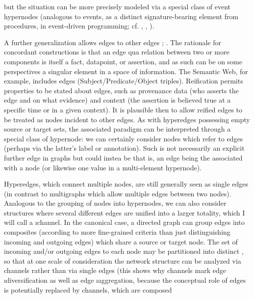 {\begin{description}
but the situation can be more precisely modeled via a 
special class of event hypernodes (analogous to 
events, as a distinct signature-bearing element from 
procedures, in event-driven programming; 
cf. \cite{JenniferPaykin}, 
\cite{PaykinKrishnaswami}, \cite{WolfgangJeltsch}). 
\item[Edges Incident to Edges]  A further generalization 
allows edges to  other edges 
\cite[p. 10]{BalintMolnar}; \cite[p. 13]{BenGoertzel}.
The rationale for concordant constructions is that 
an edge \mdash{} qua relation between two or more 
components \mdash{} is itself a fact, datapoint, or 
assertion, and as such can be on some perspectives a 
singular element in a space of information.  
The Semantic Web, for example, includes  
edges (Subject/Predicate/Object triples).  
Reification permits properties to be stated about edges, 
such as provenance data (who asserts the edge and on 
what evidence) and context (the assertion is believed true 
at a specific time or in a given context).  
It is plausible then to allow reified edges 
to be treated as nodes incident to other edges.  As 
with hyperedges possessing empty source or target 
sets, the associated paradigm can be interpreted through 
a special class of hypernode: we can certainly 
consider nodes which refer to edges (perhaps via the 
latter's label or annotation).  Such  
is not necessarily an explicit further edge in graphs 
but could instea be  \mdash{} that is, an edge being the 
 associated with a node (or likewise  
one value in a multi-element hypernode).
\item[Channels]   Hyperedges, which connect multiple 
nodes, are still generally seen as single edges 
(in contrast to multigraphs which allow multiple 
edges between two nodes).  Analogous to the grouping 
of nodes into hypernodes, we can also consider structures 
where several different edges are unified into a larger 
totality, which I will call a \i{channel}.  
In the canonical case, a directed graph can group 
edges into composites (according to more fine-grained criteria 
than just distinguishing incoming and outgoing edges) which share a 
source or target node.  The set of incoming and/or outgoing  edges 
to each node may be partitioned into distinct 
, so that at one scale of consideration the network 
structure can be analyzed via channels rather than via 
single edges (this shows why channels mark edge \i{diversification} 
as well as edge \i{aggregation}, because the conceptual role 
of edges is potentially replaced by channels, which are composed 

\end{description}}
